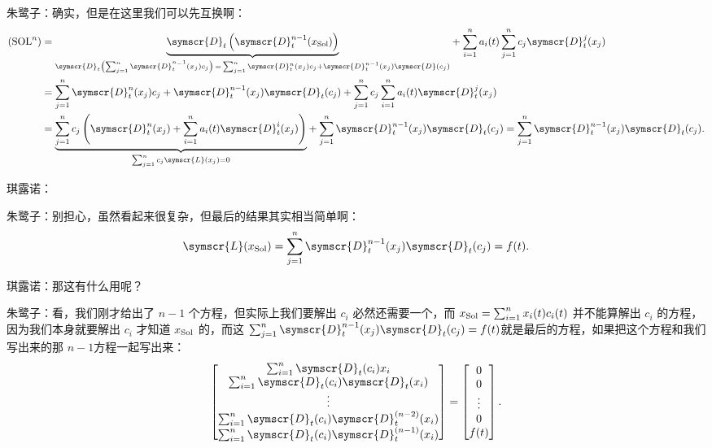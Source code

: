 朱鹭子：确实，但是在这里我们可以先互换啊：
\[
	\begin{aligned}
		(\mathrm{SOL}^n) & = \underset{\symscr{D} _t\left(\sum_{j=1}^{n} \symscr{D} _t^{n_-1}(x_j)c_j   \right) \,=\, \sum_{j=1}^{n}\symscr{D} ^n_t(x_j)c_j+\symscr{D} _t^{n-1}(x_j)\symscr{D} (c_j)}{\underbrace{\symscr{D} _t\left(  \symscr{D} _t^{n-1}(x_{\rm Sol}) \right)}} + \sum_{i=1}^{n} a_i(t)
		\sum_{j=1}^{n} c_j\symscr{D} _t^j(x_j)                                                                                                                                                                                                                                                               \\
		                 & =\sum_{j=1}^{n}\symscr{D} ^n_t(x_j)c_j+\symscr{D} _t^{n-1}(x_j)\symscr{D}_t (c_j)+\sum_{j=1}^{n} c_j\sum_{i=1}^{n} a_i(t)
		\symscr{D} _t^j(x_j)                                                                                                                                                                                                                                                                                 \\
		                 & =\underset{\sum_{j=1}^{n} c_j\symscr{L} (x_j)=0}{\underbrace{\sum_{j=1}^{n} c_j\left( \symscr{D} _t^n(x_j)+\sum_{i=1}^{n} a_i(t)\symscr{D} _t^i(x_j) \right)}}+\sum_{j=1}^{n}\symscr{D} _t^{n-1}(x_j)\symscr{D} _t(c_j)=\sum_{j=1}^{n}\symscr{D} _t^{n-1}(x_j)\symscr{D} _t(c_j).
	\end{aligned}
\]

琪露诺：

朱鹭子：别担心，虽然看起来很复杂，但最后的结果其实相当简单啊：
\[
	\symscr{L} (x_{\rm Sol})=\sum_{j=1}^{n}\symscr{D} _t^{n-1}(x_j)\symscr{D} _t(c_j) =f(t)
	.\]

琪露诺：那这有什么用呢？

朱鹭子：看，我们刚才给出了 \(n-1\) 个方程，但实际上我们要解出 \(c_i\) 必然还需要一个，而 \(x_{\rm Sol}=\sum_{i=1}^{n} x_i(t) c_i(t)\) 并不能算解出 \(c_i\) 的方程，因为我们本身就要解出 \(c_i\) 才知道 \(x_{\rm Sol}\) 的，而这 \(\sum_{j=1}^{n}\symscr{D} _t^{n-1}(x_j)\symscr{D} _t(c_j) =f(t)\)就是最后的方程，如果把这个方程和我们写出来的那 \(n-1\)方程一起写出来：
\[
	\begin{bmatrix}
		\sum_{i=1}^{n} \symscr{D} _t(c_i)x_i \\    \sum_{i=1}^{n} \symscr{D} _t(c_i)\symscr{D} _t(x_i) \\    \vdots \\    \sum_{i=1}^{n} \symscr{D} _t(c_i)\symscr{D}^{(n-2)} _t(x_i) \\
		\sum_{i=1}^{n} \symscr{D} _t(c_i)\symscr{D}^{(n-1)} _t(x_i)
	\end{bmatrix}= \begin{bmatrix}
		0 \\    0 \\    \vdots \\    0 \\    f(t) \\\end{bmatrix}
	.\]

